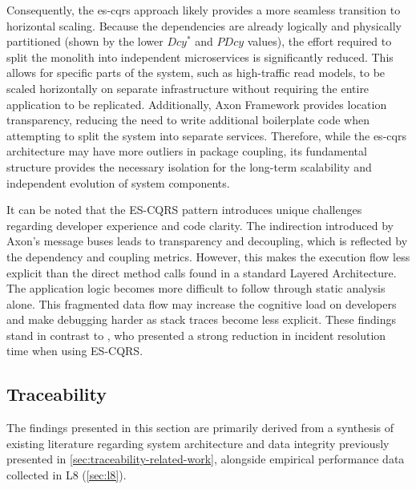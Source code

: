 Consequently, the \gls{es}-\gls{cqrs} approach likely provides a more seamless transition to horizontal scaling. Because the dependencies are already logically and physically partitioned (shown by the lower $Dcy^*$ and $PDcy$ values), the effort required to split the monolith into independent microservices is significantly reduced. This allows for specific parts of the system, such as high-traffic read models, to be scaled horizontally on separate infrastructure without requiring the entire application to be replicated. Additionally, Axon Framework provides location transparency, reducing the need to write additional boilerplate code when attempting to split the system into separate services. Therefore, while the \gls{es}-\gls{cqrs} architecture may have more outliers in package coupling, its fundamental structure provides the necessary isolation for the long-term scalability and independent evolution of system components.

It can be noted that the ES-CQRS pattern introduces unique challenges regarding developer experience and code clarity. The indirection introduced by Axon's message buses leads to transparency and decoupling, which is reflected by the dependency and coupling metrics. However, this makes the execution flow less explicit than the direct method calls found in a standard Layered Architecture. The application logic becomes more difficult to follow through static analysis alone. This fragmented data flow may increase the cognitive load on developers and make debugging harder as stack traces become less explicit. These findings stand in contrast to \cite{monagari_demystifying_2026}, who presented a strong reduction in incident resolution time when using ES-CQRS.

\subsection{Traceability}

The findings presented in this section are primarily derived from a synthesis of existing literature regarding system architecture and data integrity previously presented in \autoref{sec:traceability-related-work}, alongside empirical performance data collected in L8 (\autoref{sec:l8}).

